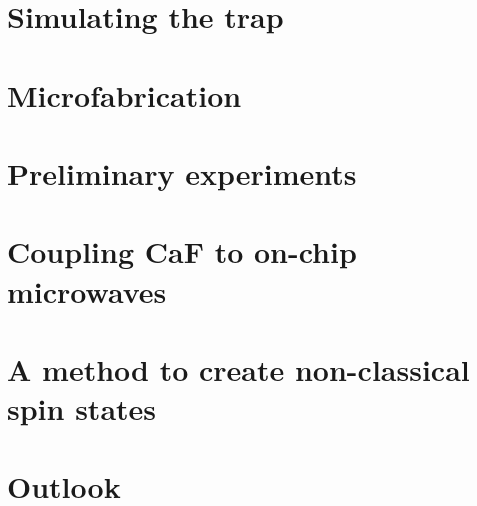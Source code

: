 \documentclass[a4paper, 12pt, twoside]{report}
\newcommand{\CaF}{CaF}
\begin{document}
\chapter{Simulating the trap}
\label{sim}


\chapter{Microfabrication}
\label{fab}


\chapter{Preliminary experiments}
\label{exper}


\chapter{Coupling \CaF{} to on-chip microwaves}
\label{mws}


\chapter{A method to create non-classical spin states}
\label{squeeze}


\chapter{Outlook}
\label{outlook}


\clearpage

\begin{singlespace}
\printbibliography
\end{singlespace}
\end{document}
